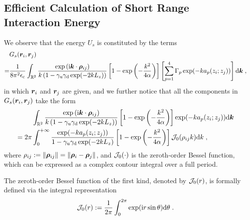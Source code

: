 \subsection{Efficient Calculation of Short Range Interaction Energy}
We observe that the energy $U_s$ is constituted  by the terms
\begin{align*}
  &G_s(\boldsymbol{r}_i, \boldsymbol{r}_j)\\
   =& \frac{1}{8\pi^2\epsilon_{\mathrm{c}}}\int_{\mathbb{R}^2} \frac{ \exp{(\mathrm{i} \boldsymbol{k} \cdot \boldsymbol{\rho}_{ij})}}{k\left(1-\gamma_{\mathrm{u}}\gamma_{\mathrm{d}}\exp(-2kL_z)\right)} \left[1-\exp\left(-\frac{k^2}{4\alpha}\right)\right]\left[\sum_{p=1}^4\Gamma_p\exp(-ka_p(z_i;z_j))\right]\mathrm{d} \bm{k}\;,  
\end{align*}
in which $\bm{r}_i$ and $\bm{r}_j$ are given, and we further notice  that all the components in $G_s(\boldsymbol{r}_i, \boldsymbol{r}_j)$ take the form
\begin{align*}
   & \int_{\mathbb{R}^2} \frac{ \exp{(\mathrm{i} \boldsymbol{k} \cdot \boldsymbol{\rho}_{ij})}}{k\left(1-\gamma_{\mathrm{u}}\gamma_{\mathrm{d}}\exp(-2kL_z)\right)} \left[1-\exp\left(-\frac{k^2}{4\alpha}\right)\right]\exp(-ka_p(z_i;z_j))\mathrm{d} \bm{k}\\
   =2\pi&\int_0^{+\infty} \frac{ \exp(-ka_p(z_i;z_j))}{1-\gamma_{\mathrm{u}}\gamma_{\mathrm{d}}\exp(-2kL_z)} \left[1-\exp\left(-\frac{k^2}{4\alpha}\right)\right]\mathcal{J}_0(\rho_{ij}k)\mathrm{d} k\;,
\end{align*}
where $\rho_{ij}:=\left\lVert\bm{\rho}_{ij}\right\rVert=\left\lVert\bm{\rho}_i-\bm{\rho}_j\right\rVert$, and $\mathcal{J}_0(\cdot)$ is the zeroth-order Bessel function,  which  can   be expressed as a complex contour integral over a full period.
\begin{defi}
    The zeroth-order Bessel function of the first kind, denoted by $\mathcal{J}_0(r)$, is formally defined via the integral representation
\begin{equation}
      \mathcal{J}_0(r):=\frac{1}{2\pi} \int_0^{2\pi} \exp(\mathrm{i} r\sin \theta) \mathrm{d} \theta\;.  
    \end{equation}
\end{defi}
